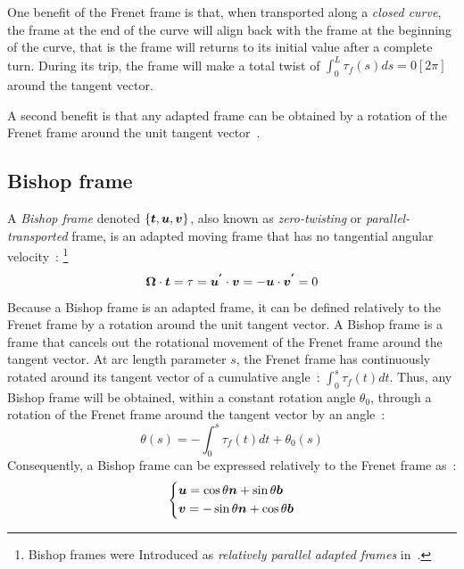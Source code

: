 One benefit of the Frenet frame is that, when transported along a \emph{closed curve}, the frame at the end of the curve will align back with the frame at the beginning of the curve, that is the frame will returns to its initial value after a complete turn. During its trip, the frame will make a total twist of $\int_0^L \tau_f(s)ds = 0[2\pi]$ around the tangent vector.

A second benefit is that any adapted frame can be obtained by a rotation of the Frenet frame around the unit tangent vector~\cite[p.2]{Guggenheimer1989}.

\subsection{Bishop frame}\label{sec:bishop}

A \emph{Bishop frame} denoted $\{\boldsymbol{t},\boldsymbol{u},\boldsymbol{v}\}$, also known as \emph{zero-twisting} or \emph{parallel-transported} frame, is an adapted moving frame that has no tangential angular velocity~: \footnote{Bishop frames were Introduced as \emph{relatively parallel adapted frames} in~\cite{Bishop1975}.}
\begin{equation}
	\boldsymbol{\Omega} \cdot \boldsymbol{t} = \tau =\boldsymbol{u^{'}} \cdot \boldsymbol{v} = - \boldsymbol{u} \cdot \boldsymbol{v^{'}} = 0
\end{equation}
Because a Bishop frame is an adapted frame, it can be defined relatively to the Frenet frame by a rotation around the unit tangent vector. A Bishop frame is a frame that cancels out the rotational movement of the Frenet frame around the tangent vector. At arc length parameter $s$, the Frenet frame has continuously rotated around its tangent vector of a cumulative angle~: $\int_0^s \tau_f(t)dt$. Thus, any Bishop frame will be obtained, within a constant rotation angle $\theta_0$, through a rotation of the Frenet frame around the tangent vector by an angle~:
\begin{equation}
	\theta(s)  =  - \int_0^s \tau_f(t)dt + \theta_0(s)
\end{equation}
Consequently, a Bishop frame can be expressed relatively to the Frenet frame as~:
\begin{equation}
	\left\{
	\begin{aligned}
		&\boldsymbol{u} = \cos \theta \boldsymbol{n} +  \sin \theta \boldsymbol{b}\\
		&\boldsymbol{v} = -\sin \theta \boldsymbol{n} +  \cos \theta \boldsymbol{b}
	\end{aligned}
	\right.
\end{equation}
